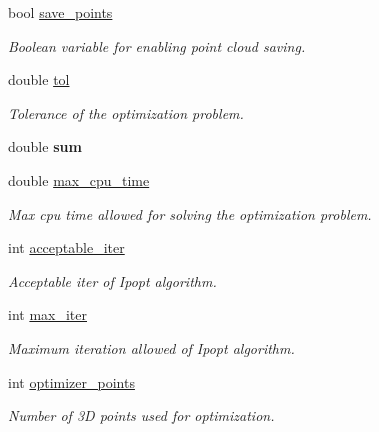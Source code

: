 \begin{DoxyCompactItemize}
\mbox{\label{classSuperqModule_a67a8bc8f0d0464efc29caf5465f256e6}} 
bool \mbox{\hyperlink{classSuperqModule_a67a8bc8f0d0464efc29caf5465f256e6}{save\+\_\+points}}
\begin{DoxyCompactList}\small\item\em Boolean variable for enabling point cloud saving. \end{DoxyCompactList}\item 
\mbox{\label{classSuperqModule_ad4843804d3d340b725debf434e5347b5}} 
double \mbox{\hyperlink{classSuperqModule_ad4843804d3d340b725debf434e5347b5}{tol}}
\begin{DoxyCompactList}\small\item\em Tolerance of the optimization problem. \end{DoxyCompactList}\item 
\mbox{\label{classSuperqModule_a01f96b54badeaf38908355577586a4c0}} 
double {\bfseries sum}
\item 
\mbox{\label{classSuperqModule_aace6a0e5aa42c5e376a5e60397a4dcea}} 
double \mbox{\hyperlink{classSuperqModule_aace6a0e5aa42c5e376a5e60397a4dcea}{max\+\_\+cpu\+\_\+time}}
\begin{DoxyCompactList}\small\item\em Max cpu time allowed for solving the optimization problem. \end{DoxyCompactList}\item 
\mbox{\label{classSuperqModule_ab3c64f8ffe227d91ab3fcc8983589b3a}} 
int \mbox{\hyperlink{classSuperqModule_ab3c64f8ffe227d91ab3fcc8983589b3a}{acceptable\+\_\+iter}}
\begin{DoxyCompactList}\small\item\em Acceptable iter of Ipopt algorithm. \end{DoxyCompactList}\item 
\mbox{\label{classSuperqModule_ae130c3d3d0ac884336761ded94731f1b}} 
int \mbox{\hyperlink{classSuperqModule_ae130c3d3d0ac884336761ded94731f1b}{max\+\_\+iter}}
\begin{DoxyCompactList}\small\item\em Maximum iteration allowed of Ipopt algorithm. \end{DoxyCompactList}\item 
\mbox{\label{classSuperqModule_ae796a494cc0be47bf8888e9f876784dc}} 
int \mbox{\hyperlink{classSuperqModule_ae796a494cc0be47bf8888e9f876784dc}{optimizer\+\_\+points}}
\begin{DoxyCompactList}\small\item\em Number of 3D points used for optimization. \end{DoxyCompactList}\item 

\end{DoxyCompactItemize}
